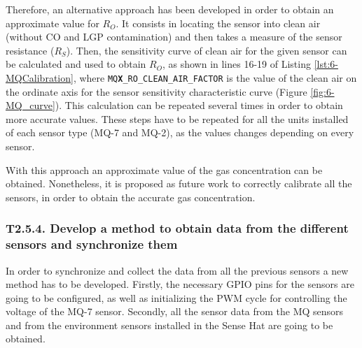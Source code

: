 Therefore, an alternative approach has been developed in order to obtain an approximate value for ${R}_{O}$. It consists in locating the sensor into clean air (without CO and LGP contamination) and then takes a measure of the sensor resistance (${R}_{S}$). Then, the sensitivity curve of clean air for the given sensor can be calculated and used to obtain ${R}_{O}$, as shown in lines 16-19 of Listing \ref{lst:6-MQCalibration}, where \texttt{MQ\textbf{X}\_RO\_CLEAN\_AIR\_FACTOR} is the value of the clean air on the ordinate axis for the sensor sensitivity characteristic curve (Figure \ref{fig:6-MQ_curve}). This calculation can be repeated several times in order to obtain more accurate values. These steps have to be repeated for all the units installed of each sensor type (MQ-7 and MQ-2), as the values changes depending on every sensor.



With this approach an approximate value of the gas concentration can be obtained. Nonetheless, it is proposed as future work to correctly calibrate all the sensors, in order to obtain the accurate gas concentration.


\subsubsection{T2.5.4. Develop a method to obtain data from the different sensors and synchronize them}

In order to synchronize and collect the data from all the previous sensors a new method has to be developed. Firstly, the necessary GPIO pins for the sensors are going to be configured, as well as initializing the \ac{PWM} cycle for controlling the voltage of the MQ-7 sensor. Secondly, all the sensor data from the MQ sensors and from the environment sensors installed in the Sense Hat \cite{SenseHAT} are going to be obtained.


